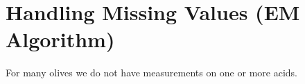 \section{Handling Missing Values (EM Algorithm)}

For many olives we do not have measurements on one or more acids.
